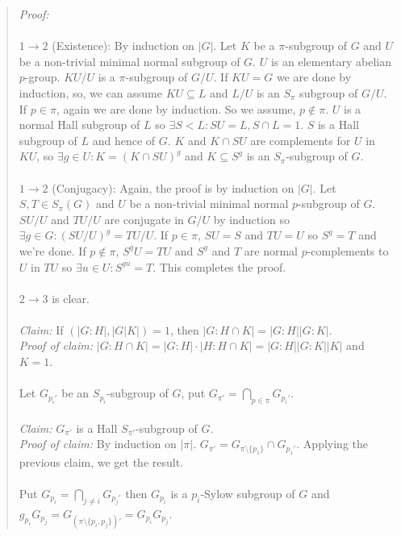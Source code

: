 \begin{quote}
\emph{Proof:}  
\\
\\
$1 \rightarrow 2$ (Existence): 
By induction on $|G|$.  Let $K$ be a $\pi$-subgroup of $G$ and
$U$ be a non-trivial minimal normal subgroup of $G$.  $U$ is an elementary abelian
$p$-group.  $KU/U$ is a $\pi$-subgroup of $G/U$.  If $KU=G$ we are done by induction,
so, we can assume $KU \subseteq L$ and $L/U$ is an $S_{\pi}$ subgroup of $G/U$.
If $p \in \pi$, again we are done by induction.  So we assume, $p \notin \pi$.  $U$ is a
normal Hall subgroup of $L$ so $\exists S<L: SU=L, S \cap L = 1$.  $S$ is a Hall subgroup of
$L$ and hence of $G$.  $K$ and $K \cap SU$ are complements for $U$ in $KU$, so 
$\exists g \in U: K=(K \cap SU)^g$ and $K \subseteq S^g$ is an $S_{\pi}$-subgroup of $G$.
\\
\\
$1 \rightarrow 2$ (Conjugacy): 
Again, the proof is by induction on $|G|$.
Let $S, T \in S_{\pi}(G)$ and $U$ be a non-trivial minimal normal $p$-subgroup of $G$.
$SU/U$ and $TU/U$ are conjugate in $G/U$ by induction so $\exists g \in G: (SU/U)^g= TU/U$.
If $p \in \pi$, $SU=S$ and $TU=U$ so $S^g=T$ and we're done.
If $p \notin \pi$, $S^gU = TU$ and $S^g$ and $T$ are normal $p$-complements to $U$ in $TU$
so $\exists u \in U: S^{gu}= T$.  This completes the proof.
\\
\\
$2 \rightarrow 3$ is clear.
\\
\\
\emph{Claim:} If $(|G:H|,|G|K|)= 1$, then $|G: H \cap K|= |G:H| |G:K|$.
\\
\emph{Proof of claim:} 
$|G:H \cap K|= |G:H| \cdot |H: H \cap K| = |G:H| |G:K| |K|$ and $K=1$.
\\
\\
Let $G_{p_i'}$ be an $S_{p_i}$-subgroup of $G$, put $G_{\pi'}= \bigcap_{p \in \pi} G_{p_i'}$.
\\
\\
\emph{Claim:} $G_{\pi'}$ is a Hall $S_{\pi'}$-subgroup of $G$.
\\
\emph{Proof of claim:} 
By induction on $|\pi|$.
$G_{\pi'}= G_{\pi \setminus \{ p_1 \}} \cap G_{p_1'}$.  Applying the previous claim, we get
the result.
\\
\\
Put $G_{p_i}= \bigcap_{j \ne i} G_{p_j'}$  then $G_{p_i}$ is a $p_i$-Sylow subgroup of $G$ and
$g_{p_i} G_{p_j}= G_{(\pi \setminus \{ p_i , p_j \})'} = G_{p_i} G_{p_j}$.
\\

\end{quote}
